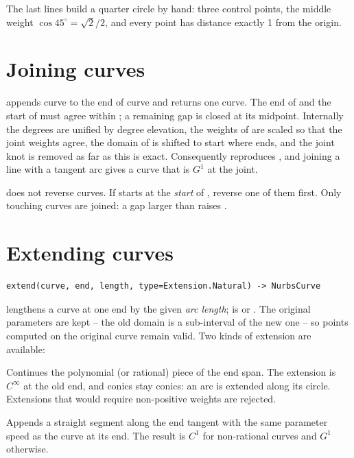 The last lines build a quarter circle by hand: three control points, the middle weight
$\cos 45^\circ = \sqrt2/2$, and every point has distance exactly 1 from the origin.

\section{Joining curves}\label{sec:join}

 appends curve  to the end of curve 
and returns one curve. The end of  and the start of  must agree within
; a remaining gap is closed at its midpoint. Internally the degrees are unified by
degree elevation, the weights of  are scaled so that the joint weights agree, the domain
of  is shifted to start where  ends, and the joint knot is removed as far as
this is exact. Consequently  reproduces , and joining a
line with a tangent arc gives a curve that is $G^1$ at the joint.

\begin{warning}
 does not reverse curves. If  starts at the \emph{start} of , reverse
one of them first. Only touching curves are joined: a gap larger than  raises
.
\end{warning}

\section{Extending curves}\label{sec:curve-extend}

\begin{lstlisting}[style=text]
extend(curve, end, length, type=Extension.Natural) -> NurbsCurve
\end{lstlisting}

 lengthens a curve at one end by the given \emph{arc length};  is
 or . The original parameters are kept -- the old
domain is a sub-interval of the new one -- so points computed on the original curve remain
valid. Two kinds of extension are available:

\begin{description}[style=nextline]
\item[\code{Extension.Natural}] Continues the polynomial (or rational) piece of the end span. The
  extension is $C^\infty$ at the old end, and conics stay conics: an arc is extended along its
  circle. Extensions that would require non-positive weights are rejected.
\item[\code{Extension.Linear}] Appends a straight segment along the end tangent with the same
  parameter speed as the curve at its end. The result is $C^1$ for non-rational curves and $G^1$
  otherwise.
\end{description}

